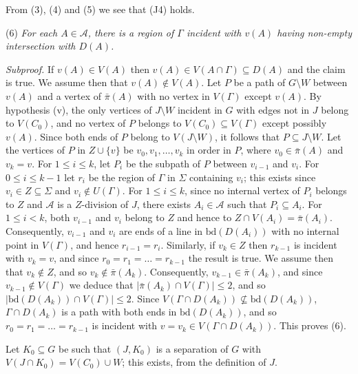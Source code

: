 From (3), (4) and (5) we see that (J4) holds.

\hspace*{12pt}(6) \textit{For each $A \in \mathcal{A}$, there is a region of $\Gamma$ incident with $v(A)$ having non-empty intersection with $D(A)$.}

\textit{Subproof.} If $v(A) \in V(A)$ then $v(A) \in V(A \cap \Gamma) \subseteq D(A)$ and the claim is true. We assume then that $v(A) \notin V(A)$. Let $P$ be a path of $G \setminus W$ between $v(A)$ and a vertex of $\bar{\pi}(A)$ with no vertex in $V(\Gamma)$ except $v(A)$. By hypothesis (v), the only vertices of $J \setminus W$ incident in $G$ with edges not in $J$ belong to $V(C_0)$, and no vertex of $P$ belongs to $V(C_0) \subseteq V(\Gamma)$ except possibly $v(A)$. Since both ends of $P$ belong to $V(J \setminus W)$, it follows that $P \subseteq J \setminus W$. Let the vertices of $P$ in $Z \cup \{v\}$ be $v_0, v_1, \dots, v_k$ in order in $P$, where $v_0 \in \bar{\pi}(A)$ and $v_k = v$. For $1 \le i \le k$, let $P_i$ be the subpath of $P$ between $v_{i-1}$ and $v_i$. For $0 \le i \le k - 1$ let $r_i$ be the region of $\Gamma$ in $\Sigma$ containing $v_i$; this exists since $v_i \in Z \subseteq \Sigma$ and $v_i \notin U(\Gamma)$. For $1 \le i \le k$, since no internal vertex of $P_i$ belongs to $Z$ and $\mathcal{A}$ is a $Z$-division of $J$, there exists $A_i \in \mathcal{A}$ such that $P_i \subseteq A_i$. For $1 \le i < k$, both $v_{i-1}$ and $v_i$ belong to $Z$ and hence to $Z \cap V(A_i) = \bar{\pi}(A_i)$. Consequently, $v_{i-1}$ and $v_i$ are ends of a line in $\text{bd}(D(A_i))$ with no internal point in $V(\Gamma)$, and hence $r_{i-1} = r_i$. Similarly, if $v_k \in Z$ then $r_{k-1}$ is incident with $v_k = v$, and since $r_0 = r_1 = \dots = r_{k-1}$ the result is true. We assume then that $v_k \notin Z$, and so $v_k \notin \bar{\pi}(A_k)$. Consequently, $v_{k-1} \in \bar{\pi}(A_k)$, and since $v_{k-1} \notin V(\Gamma)$ we deduce that $|\bar{\pi}(A_k) \cap V(\Gamma)| \le 2$, and so $|\text{bd}(D(A_k)) \cap V(\Gamma)| \le 2$. Since $V(\Gamma \cap D(A_k)) \not\subseteq \text{bd}(D(A_k))$, $\Gamma \cap D(A_k)$ is a path with both ends in $\text{bd}(D(A_k))$, and so $r_0 = r_1 = \dots = r_{k-1}$ is incident with $v = v_k \in V(\Gamma \cap D(A_k))$. This proves (6).

Let $K_0 \subseteq G$ be such that $(J, K_0)$ is a separation of $G$ with $V(J \cap K_0) = V(C_0) \cup W$; this exists, from the definition of $J$.


